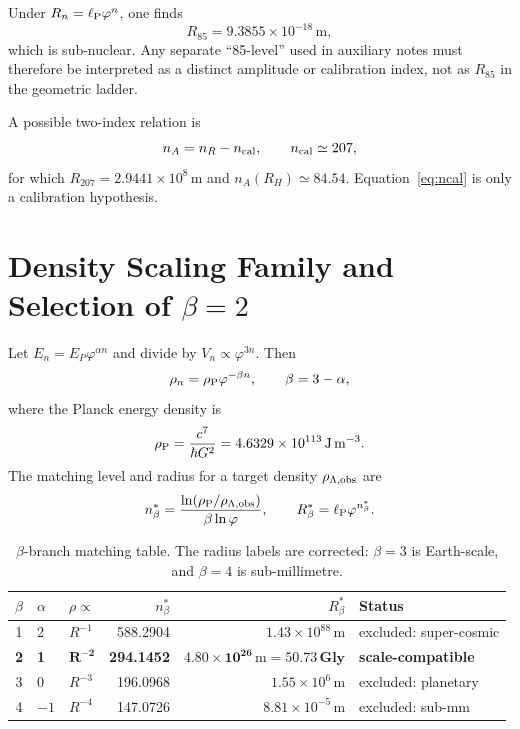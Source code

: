 \documentclass[11pt,a4paper]{article}
\newcommand{\vph}{\varphi}
\newcommand{\ellP}{\ell_{\rm P}}
\newcommand{\rhoP}{\rho_{\rm P}}
\newcommand{\rhoL}{\rho_{\Lambda,{\rm obs}}}
\newcommand{\RH}{R_H}
\begin{document}
\begin{caveatbox}
Under $R_n=\ellP\vph^n$, one finds
\begin{equation}
R_{85}=9.3855\times10^{-18}\,\mathrm{m},
\end{equation}
which is sub-nuclear.  Any separate ``85-level'' used in auxiliary notes must
therefore be interpreted as a distinct amplitude or calibration index, not as
$R_{85}$ in the geometric ladder.
\end{caveatbox}

A possible two-index relation is
\begin{equation}
 n_A=n_R-n_{\rm cal},\qquad n_{\rm cal}\simeq207,
\label{eq:ncal}
\end{equation}
for which $R_{207}=2.9441\times10^8\,\mathrm{m}$ and
$n_A(\RH)\simeq84.54$.  Equation~\eqref{eq:ncal} is only a calibration
hypothesis.

\section{Density Scaling Family and Selection of \texorpdfstring{$\beta=2$}{beta=2}}
\label{sec:beta}

Let $E_n=E_P\vph^{\alpha n}$ and divide by $V_n\propto\vph^{3n}$.  Then
\begin{equation}
\rho_n=\rhoP\vph^{-\beta n},\qquad \beta=3-\alpha,
\label{eq:rho_beta}
\end{equation}
where the Planck energy density is
\begin{equation}
\rhoP=\frac{c^7}{\hbar G^2}=4.6329\times10^{113}\,\mathrm{J\,m^{-3}}.
\end{equation}
The matching level and radius for a target density $\rhoL$ are
\begin{equation}
n^*_\beta=\frac{\ln(\rhoP/\rhoL)}{\beta\ln\vph},
\qquad
R^*_\beta=\ellP\vph^{n^*_\beta}.
\label{eq:nstar}
\end{equation}

\begin{table}[htbp]
\centering
\caption{$\beta$-branch matching table.  The radius labels are corrected: $\beta=3$ is Earth-scale, and $\beta=4$ is sub-millimetre.}
\label{tab:beta}
\small
\begin{tabular}{@{}cllrrl@{}}
\toprule
$\beta$ & $\alpha$ & $\rho\propto$ & $n^*_{\beta}$ & $R^*_{\beta}$ & Status \\
\midrule
1 & 2 & $R^{-1}$ & 588.2904 & $1.43\times10^{88}\,\mathrm{m}$ & excluded: super-cosmic \\
\textbf{2} & \textbf{1} & $\mathbf{R^{-2}}$ & \textbf{294.1452} & $\mathbf{4.80\times10^{26}\,\mathrm{m}=50.73\,Gly}$ & \textbf{scale-compatible} \\
3 & 0 & $R^{-3}$ & 196.0968 & $1.55\times10^6\,\mathrm{m}$ & excluded: planetary \\
4 & $-1$ & $R^{-4}$ & 147.0726 & $8.81\times10^{-5}\,\mathrm{m}$ & excluded: sub-mm \\
\bottomrule
\end{tabular}
\end{table}
\end{document}
